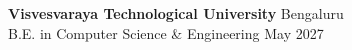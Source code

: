 \item{
    \textbf{Visvesvaraya Technological University} \hfill {Bengaluru} \\
    {B.E. in Computer Science \& Engineering} \hfill {May 2027} \\
}
